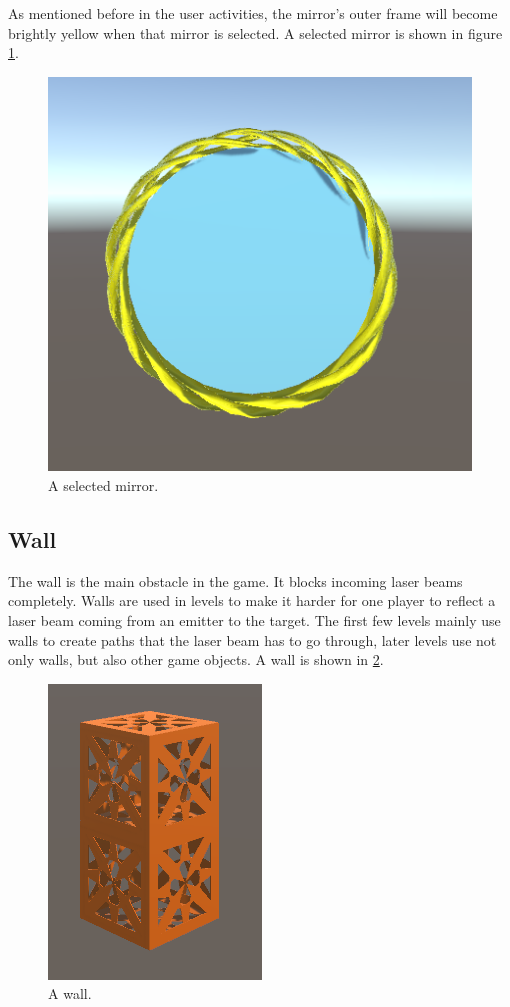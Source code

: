 			As mentioned before in the user activities, the mirror's outer
			frame will become brightly yellow when that mirror is selected.
			A selected mirror is shown in figure \ref{fig:selectedmirror}.
			\begin{figure}[!ht]
				\centering
				\includegraphics[scale = 0.3]{SelectedMirror}
				\caption{A selected mirror.}
				\label{fig:selectedmirror}
			\end{figure}
			
		\subsection{Wall} \label{ssec:wall}
			The wall is the main obstacle in the game. It blocks incoming
			laser beams completely. Walls are used in levels to make it 
			harder for one player to reflect a laser beam coming from
			an emitter to the target. The first few levels mainly use walls
			to create paths that the laser beam has to go through, later
			levels use not only walls, but also other game objects. A wall
			is shown in \ref{fig:wall}.
			\begin{figure}[!ht]
				\centering
				\includegraphics[scale = 0.5]{Wall}
				\caption{A wall.}
				\label{fig:wall}
			\end{figure}
			

